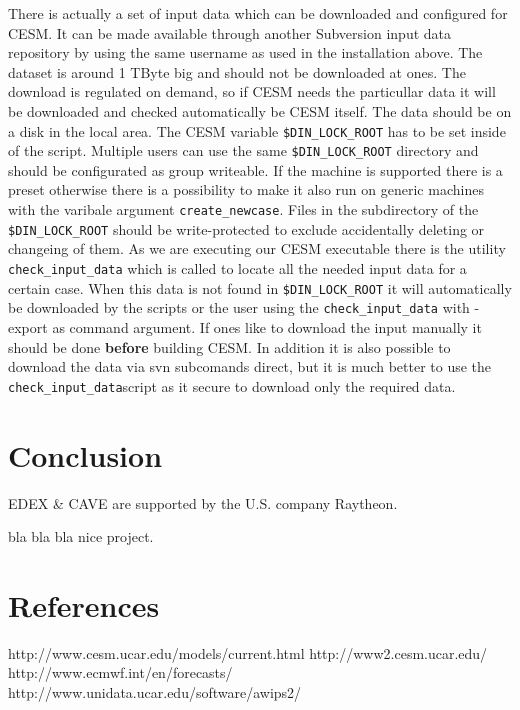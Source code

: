\documentclass[]{article}
\begin{document}
There is actually a set of input data which can be downloaded and
configured for CESM. It can be made available through another Subversion
input data repository by using the same username as used in the
installation above. The dataset is around 1 TByte big and should not be
downloaded at ones. The download is regulated on demand, so if CESM
needs the particullar data it will be downloaded and checked
automatically be CESM itself. The data should be on a disk in the local
area. The CESM variable \texttt{\$DIN\_LOCK\_ROOT} has to be set inside
of the script. Multiple users can use the same
\texttt{\$DIN\_LOCK\_ROOT} directory and should be configurated as group
writeable. If the machine is supported there is a preset otherwise there
is a possibility to make it also run on generic machines with the
varibale argument \texttt{create\_newcase}. Files in the subdirectory of
the \texttt{\$DIN\_LOCK\_ROOT} should be write-protected to exclude
accidentally deleting or changeing of them. As we are executing our CESM
executable there is the utility \texttt{check\_input\_data} which is
called to locate all the needed input data for a certain case. When this
data is not found in \texttt{\$DIN\_LOCK\_ROOT} it will automatically be
downloaded by the scripts or the user using the
\texttt{check\_input\_data} with -export as command argument. If ones
like to download the input manually it should be done \textbf{before}
building CESM. In addition it is also possible to download the data via
svn subcomands direct, but it is much better to use the
\texttt{check\_input\_data}script as it secure to download only the
required data.

\section{Conclusion}\label{conclusion}

EDEX \& CAVE are supported by the U.S. company Raytheon.

bla bla bla nice project.

\section{References}\label{references}

http://www.cesm.ucar.edu/models/current.html http://www2.cesm.ucar.edu/
http://www.ecmwf.int/en/forecasts/
http://www.unidata.ucar.edu/software/awips2/
\end{document}
